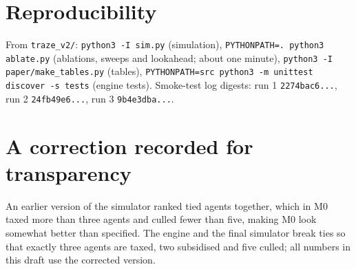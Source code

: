 \documentclass[11pt]{article}
\theoremstyle{plain}
\theoremstyle{remark}
\begin{document}
\section{Reproducibility}
From \texttt{traze\_v2/}: \texttt{python3 -I sim.py} (simulation), \texttt{PYTHONPATH=. python3 ablate.py} (ablations, sweeps and lookahead; about one minute), \texttt{python3 -I paper/make\_tables.py} (tables), \texttt{PYTHONPATH=src python3 -m unittest discover -s tests} (engine tests). Smoke-test log digests: run 1 \texttt{2274bac6...}, run 2 \texttt{24fb49e6...}, run 3 \texttt{9b4e3dba...}.

\section{A correction recorded for transparency}
An earlier version of the simulator ranked tied agents together, which in M0 taxed more than three agents and culled fewer than five, making M0 look somewhat better than specified. The engine and the final simulator break ties so that exactly three agents are taxed, two subsidised and five culled; all numbers in this draft use the corrected version.
\end{document}
